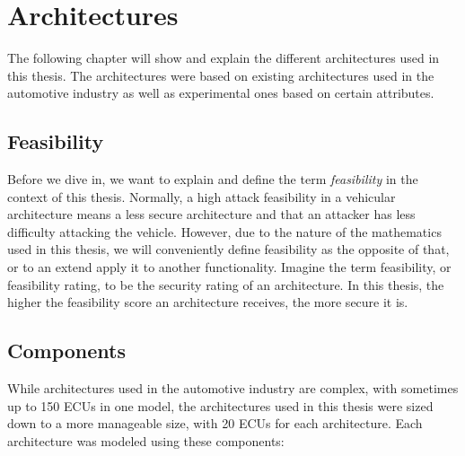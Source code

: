 \chapter{Architectures}
\label{chp:arch}

The following chapter will show and explain the different architectures used in this thesis.
The architectures were based on existing architectures used in the automotive industry as well as experimental ones based on certain attributes.

\section{Feasibility}
\label{def:feasibility}

Before we dive in, we want to explain and define the term \textit{feasibility} in the context of this thesis.
Normally, a high attack feasibility in a vehicular architecture means a less secure architecture and that an attacker has less difficulty attacking the vehicle.
However, due to the nature of the mathematics used in this thesis, we will conveniently define feasibility as the opposite of that, or to an extend apply it to another functionality.
Imagine the term feasibility, or feasibility rating, to be the security rating of an architecture.
In this thesis, the higher the feasibility score an architecture receives, the more secure it is. 

\section{Components}
\label{sec:components}

While architectures used in the automotive industry are complex, with sometimes up to 150 ECUs in one model, 
the architectures used in this thesis were sized down to a more manageable size, with 20 ECUs for each architecture.
Each architecture was modeled using these components:

